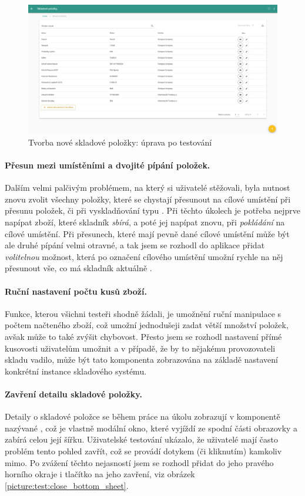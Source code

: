 \begin{figure}[h]
\includegraphics[width=\textwidth]{../png/app_testing/plus_after.png}
\caption{Tvorba nové skladové položky: úprava po testování} \label{picture:test:add_after}
\end{figure}


\paragraph{Přesun mezi umístěními a dvojité pípání položek.} Dalším velmi palčivým problémem, na který si uživatelé stěžovali, byla nutnost znovu zvolit všechny položky, které se chystají přesunout na cílové umístění při přesunu položek, či při vyskladňování typu . Při těchto úkolech je potřeba nejprve napípat zboží, které skladník \emph{sbírá}, a poté jej napípat znovu, při \emph{pokládání} na cílové umístění. Při přesunech, které mají pevně dané cílové umístění může být ale druhé pípání velmi otravné, a tak jsem se rozhodl do aplikace přidat \emph{volitelnou} možnost, která po označení cílového umístění umožní rychle na něj přesunout vše, co má skladník aktuálně . 

\paragraph{Ruční nastavení počtu kusů zboží.} Funkce, kterou všichni testeři shodně žádali, je umožnění ruční manipulace s počtem načteného zboží, což umožní jednodušeji zadat větší množství položek, avšak může to také zvýšit chybovost. Přesto jsem se rozhodl nastavení přímé kusovosti uživatelům umožnit a v případě, že by to nějakému provozovateli skladu vadilo, může být tato komponenta zobrazována na základě nastavení konkrétní instance skladového systému.

\paragraph{Zavření detailu skladové položky.} Detaily o skladové položce se během práce na úkolu zobrazují v komponentě nazývané , což je vlastně modální okno, které vyjíždí ze spodní části obrazovky a zabírá celou její šířku. Uživatelské testování ukázalo, že uživatelé mají často problém tento pohled zavřít, což se provádí dotykem (či kliknutím) kamkoliv mimo. Po zvážení těchto nejasností jsem se rozhodl přidat do jeho pravého horního okraje i tlačítko na jeho zavření, viz obrázek \ref{picture:test:close_bottom_sheet}.

